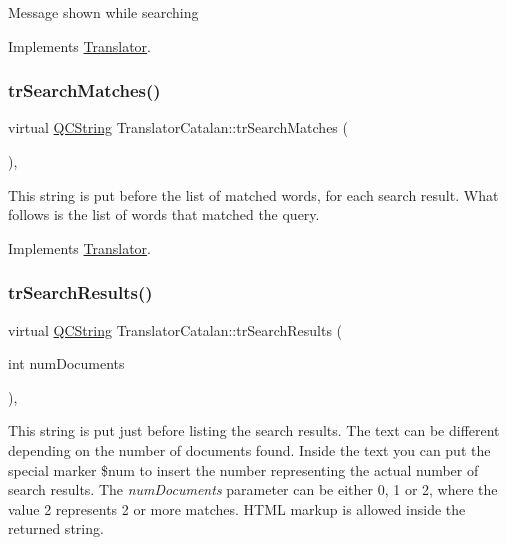 Message shown while searching 

Implements \mbox{\hyperlink{class_translator}{Translator}}.

\mbox{\label{class_translator_catalan_adace128db1827b66db727a087d86a000}} 
\subsubsection{\texorpdfstring{trSearchMatches()}{trSearchMatches()}}
{\footnotesize\ttfamily virtual \mbox{\hyperlink{class_q_c_string}{Q\+C\+String}} Translator\+Catalan\+::tr\+Search\+Matches (\begin{DoxyParamCaption}{ }\end{DoxyParamCaption})\hspace{0.3cm}{\ttfamily [inline]}, {\ttfamily [virtual]}}

This string is put before the list of matched words, for each search result. What follows is the list of words that matched the query. 

Implements \mbox{\hyperlink{class_translator}{Translator}}.

\mbox{\label{class_translator_catalan_a9f042618a04cd2b8a0b59bbe2693bc2f}} 
\subsubsection{\texorpdfstring{trSearchResults()}{trSearchResults()}}
{\footnotesize\ttfamily virtual \mbox{\hyperlink{class_q_c_string}{Q\+C\+String}} Translator\+Catalan\+::tr\+Search\+Results (\begin{DoxyParamCaption}\item[{int}]{num\+Documents }\end{DoxyParamCaption})\hspace{0.3cm}{\ttfamily [inline]}, {\ttfamily [virtual]}}

This string is put just before listing the search results. The text can be different depending on the number of documents found. Inside the text you can put the special marker \$num to insert the number representing the actual number of search results. The {\itshape num\+Documents} parameter can be either 0, 1 or 2, where the value 2 represents 2 or more matches. H\+T\+ML markup is allowed inside the returned string. 

